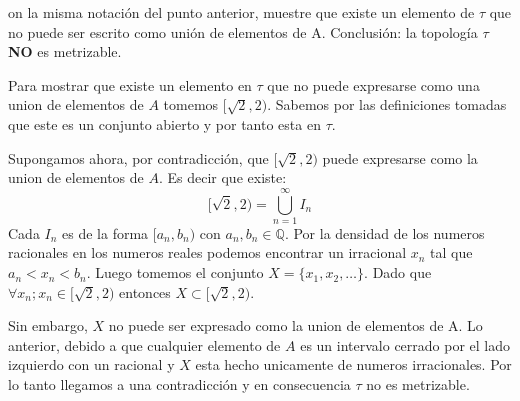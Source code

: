 \documentclass[12pt]{article}
\newenvironment{ex}[2][Ejercicio]{\begin{trivlist}
\item[\hskip \labelsep {\bfseries #1}\hskip \labelsep {\bfseries #2.}]}{\end{trivlist}}
\newenvironment{sol}[1][Solución]{\begin{trivlist}
\item[\hskip \labelsep {\bfseries #1:}]}{\end{trivlist}}
\begin{document}
\begin{ex}
	Con la misma notación del punto anterior, muestre que existe un elemento de $\tau$ que no puede ser escrito como unión de elementos de A. Conclusión: la topología $\tau$ \textbf{NO} es metrizable.
\end{ex}
\begin{sol}
	Para mostrar que existe un elemento en $\tau$ que no puede expresarse como una union de elementos de $A$ tomemos $[\sqrt{2},2)$. Sabemos por las definiciones tomadas que este es un conjunto abierto y por tanto esta en $\tau$.

	Supongamos ahora, por contradicción, que $[\sqrt{2},2)$ puede expresarse como la union de elementos de $A$. Es decir que existe:
\[[\sqrt{2}, 2) = \bigcup_{n=1}^\infty I_n\]
	Cada $I_n$ es de la forma $[a_n, b_n)$ con $a_n, b_n \in \mathbb{Q}$. Por la densidad de los numeros racionales en los numeros reales podemos encontrar un irracional $x_n$ tal que $a_n < x_n < b_n$.  Luego tomemos el conjunto $X = \{x_1, x_2, \ldots \}$. Dado que $\forall x_n; x_n \in [\sqrt{2}, 2)$ entonces $X \subset [\sqrt{2},2)$.

	Sin embargo, $X$ no puede ser expresado como la union de elementos de A. Lo anterior, debido a que cualquier elemento de $A$ es un intervalo cerrado por el lado izquierdo con un racional y $X$ esta hecho unicamente de numeros irracionales. Por lo tanto llegamos a una contradicción y en consecuencia $\tau$ no es metrizable.
\end{sol}
\end{document}
